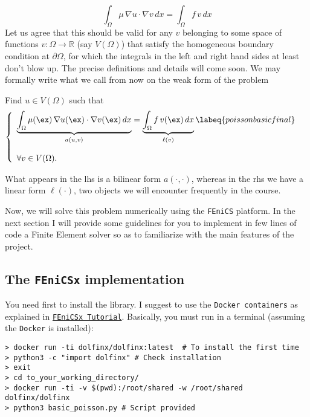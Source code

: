 \begin{equation}
\int_{\Omega}{\mu\,\nabla{u}\cdot \nabla{v} }\,dx = \int_{\Omega}{f\,v}\,dx 
\end{equation}
Let us agree that this should be valid for any $v$ belonging to some space of
functions $v: \Omega \rightarrow \mathbb{R}$ (say $V(\Omega)$) that satisfy
the homogeneous boundary condition at $\partial{\Omega}$, for which the integrals
in the left and right hand sides at least don't blow up.
The precise definitions and details will come soon.
We may formally write what we call from now on the weak form of the problem
\begin{kaobox}[frametitle=Weak form of Poisson's problem]
Find $u \in V(\Omega)$ such that
\begin{equation}
\left \{
\begin{array}{ll}
\underbrace{\int_{\Omega}{\mu(\ex)\,\nabla{u}(\ex)\cdot \nabla{v}(\ex)}\,dx}_{a(u,v)} =
        \underbrace{\int_{\Omega}{f\,v(\ex)}\,dx}_{\ell(v)} \labeq{poissonbasicfinal} & \\
        & \\
        \forall v \in V(\Omega). &
\end{array}
\right.
\end{equation}
\end{kaobox}
What appears in the lhs is a bilinear form $a(\cdot,\cdot)$,
whereas in the rhs we have a linear form
$\ell(\cdot)$, two objects we will encounter frequently
in the course.

\bigskip

Now, we will solve this problem numerically using the \texttt{FEniCS} platform.
In the next section I will provide some guidelines for you 
to implement in few lines of code a Finite Element solver so as
to familiarize with the main features of the project.

\subsection{The \texttt{FEniCSx} implementation}

You need first to install the library. I suggest to use
the \texttt{Docker containers} as explained in
\href{https://jorgensd.github.io/dolfinx-tutorial/fem.html}{\texttt{FEniCSx Tutorial}}.
Basically, you must run in a terminal (assuming the \texttt{Docker} is installed):
\begin{verbatim}
> docker run -ti dolfinx/dolfinx:latest  # To install the first time
> python3 -c "import dolfinx" # Check installation
> exit
> cd to_your_working_directory/
> docker run -ti -v $(pwd):/root/shared -w /root/shared  dolfinx/dolfinx
> python3 basic_poisson.py # Script provided
\end{verbatim}

